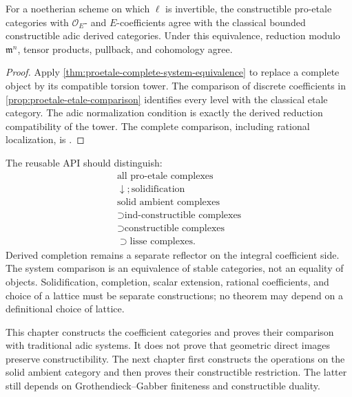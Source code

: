 \begin{theorem}
\label{thm:proetale-classical-adic-comparison}
For a noetherian scheme on which \(\ell\) is invertible, the constructible
pro-etale categories with \(\mathcal O_E\)- and \(E\)-coefficients agree with
the classical bounded constructible adic derived categories.  Under this
equivalence, reduction modulo \(\mathfrak m^n\), tensor products, pullback,
and cohomology agree.
\end{theorem}

\begin{proof}
Apply \cref{thm:proetale-complete-system-equivalence} to replace a complete
object by its compatible torsion tower.  The comparison of discrete
coefficients in \cref{prop:proetale-etale-comparison} identifies every level
with the classical etale category.  The adic normalization condition is
exactly the derived reduction compatibility of the tower.  The complete
comparison, including rational localization, is
\cite[Theorem~7.7]{HRSConstructible}.
\end{proof}

\begin{formalization}
The reusable API should distinguish:
\[
\begin{array}{c}
\text{all pro-etale complexes}\\
\downarrow;\text{solidification}\\
\text{solid ambient complexes}\\
\supset \text{ind-constructible complexes}\\
\supset \text{constructible complexes}\\
\supset \text{lisse complexes}.
\end{array}
\]
Derived completion remains a separate reflector on the integral coefficient
side.  The system comparison is an equivalence of stable categories, not an
equality of objects.  Solidification, completion, scalar extension, rational
coefficients, and choice of a lattice must be separate constructions; no
theorem may depend on a definitional choice of lattice.
\end{formalization}

\begin{auditbox}
This chapter constructs the coefficient categories and proves their
comparison with traditional adic systems.  It does not prove that geometric
direct images preserve constructibility.  The next chapter first constructs
the operations on the solid ambient category and then proves their
constructible restriction.  The latter still depends on Grothendieck--Gabber
finiteness and constructible duality.
\end{auditbox}

